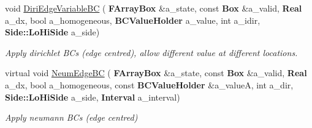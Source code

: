 \begin{DoxyCompactItemize}
void \hyperlink{class_abstract_face_b_c_function_a8a2f9d7139561aebae6dfd424d824fdb}{Diri\+Edge\+Variable\+BC} (\textbf{ F\+Array\+Box} \&a\+\_\+state, const \textbf{ Box} \&a\+\_\+valid, \textbf{ Real} a\+\_\+dx, bool a\+\_\+homogeneous, \textbf{ B\+C\+Value\+Holder} a\+\_\+value, int a\+\_\+idir, \textbf{ Side\+::\+Lo\+Hi\+Side} a\+\_\+side)
\begin{DoxyCompactList}\small\item\em Apply dirichlet B\+Cs (edge centred), allow different value at different locations. \end{DoxyCompactList}\item 
\mbox{\label{class_abstract_face_b_c_function_a02f477a3ea7e1f91fa88815dadb1d9e9}} 
virtual void \hyperlink{class_abstract_face_b_c_function_a02f477a3ea7e1f91fa88815dadb1d9e9}{Neum\+Edge\+BC} (\textbf{ F\+Array\+Box} \&a\+\_\+state, const \textbf{ Box} \&a\+\_\+valid, \textbf{ Real} a\+\_\+dx, bool a\+\_\+homogeneous, const \textbf{ B\+C\+Value\+Holder} \&a\+\_\+valueA, int a\+\_\+dir, \textbf{ Side\+::\+Lo\+Hi\+Side} a\+\_\+side, \textbf{ Interval} a\+\_\+interval)
\begin{DoxyCompactList}\small\item\em Apply neumann B\+Cs (edge centred) \end{DoxyCompactList}\end{DoxyCompactItemize}
